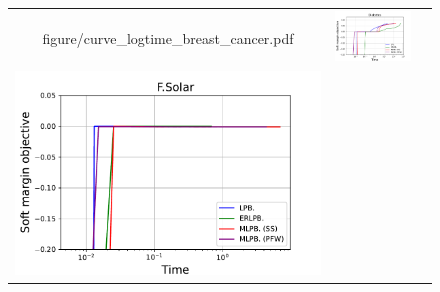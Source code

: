 \begin{figure}[p]
\begin{tabular}{ccc}
\begin{minipage}[t]{0.31\hsize}
            {figure/curve_logtime_breast_cancer.pdf}
        \end{minipage}
        &
        \begin{minipage}[t]{0.31\hsize}
            \centering
            \includegraphics[keepaspectratio, scale=0.30]
            {figure/curve_logtime_diabetis.pdf}
        \end{minipage}
        \\
        \begin{minipage}[t]{0.31\hsize}
            \centering
            \includegraphics[keepaspectratio, scale=0.30]
            {figure/curve_logtime_flare_solar.pdf}
        \end{minipage}
        &
        \begin{minipage}[t]{0.31\hsize}
            \centering

\end{minipage}
\end{tabular}
\end{figure}
